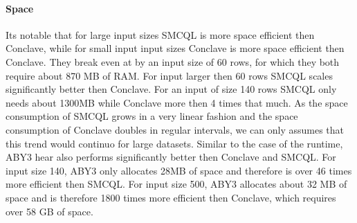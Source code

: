 \paragraph{Space}
Its notable that for large input sizes SMCQL is more space efficient then Conclave, while for small input input sizes Conclave is more space efficient then Conclave. They break even at by an input size of 60 rows, for which they both require about 870 MB of RAM. For input larger then 60 rows SMCQL scales significantly better then Conclave. For an input of size 140 rows SMCQL only needs about 1300MB while Conclave more then 4 times that much. As the space consumption of SMCQL grows in a very linear fashion and the space consumption of Conclave doubles in regular intervals, we can only assumes that this trend would continuo for large datasets. Similar to the case of the runtime, ABY3 hear also performs significantly better then Conclave and SMCQL. For input size 140, ABY3 only allocates 28MB of space and therefore is over 46 times more efficient then SMCQL. For input size 500, ABY3 allocates about 32 MB of space and is therefore 1800 times more efficient then Conclave, which requires over 58 GB of space.          
 
\label{evaluation}



